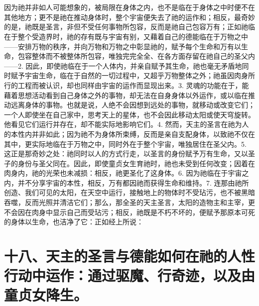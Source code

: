 
\section{}

因为祂并非如人可能想象的，被局限在身体之内，也不是临在于身体之中时便不在其他地方；更不是祂在推动身体时，整个宇宙便失去了祂的运作和；相反，最奇妙的是，祂既是圣言，非但不受任何事物所包容，反而是祂自己包容万有；正如祂临在于整个受造界时，祂的存有既与宇宙有别，又藉着自己的德能临在于万物之中——安排万物的秩序，并向万物和万物之中彰显祂的，赋予每个生命和万有以生命，包容整体而不被整体所包容，唯独完完全全、在各方面存留在祂自己的圣父内——2. 因此，即使祂临在于一个人体内，并亲自赋予其生命，祂也毫无矛盾地同时赋予宇宙生命，临在于自然的一切过程中，又超乎万物整体之外；祂虽因肉身所行的工程而被认识，却也同样由宇宙的运作而显现出来。3. 灵魂的功能在于，能藉着思想活动看到自己身体之外的事物，却无法在自身身体以外运作，或以临在推动远离身体的事物。也就是说，人绝不会因想到远处的事物，就移动或改变它们；一个人即使坐在自己家中，思考天上的星体，也不会因此移动太阳或使天穹旋转。他看见它们运行并存在，却不能实际地影响它们。4. 然而，天主的圣言在祂为人的本性内并非如此；因为祂不为身体所束缚，反而是亲自支配身体，以致祂不仅在其中，更实际地临在于万物之中，同时外在于整个宇宙，唯独居住在圣父内。5. 这正是那奇妙之处：祂同时以人的方式行走，以圣言的身份赋予万有生命，又以圣子的身份与圣父同在。因此，即使童贞女生育祂时，祂也未受到任何改变；因着在肉身内，祂的光荣也未减损：相反，祂更圣化了这身体。6. 因为祂临在于宇宙之内，并不分享宇宙的本性，相反，万有都因祂而获得生命和维持。7. 连那由祂所创造、我们可见的太阳，在天空中运行，接触地上的物体时不受玷污，也不被黑暗吞噬，反而光照并清洁它们；那么，那全圣的天主圣言，太阳的造物主和主宰，更不会因在肉身中显示自己而受玷污；相反，祂既是不朽不坏的，便赋予那原本可死的身体以生命，也洁净了它：正如经上所说：\par


\section{十八、天主的圣言与德能如何在祂的人性行动中运作：通过驱魔、行奇迹，以及由童贞女降生。}

